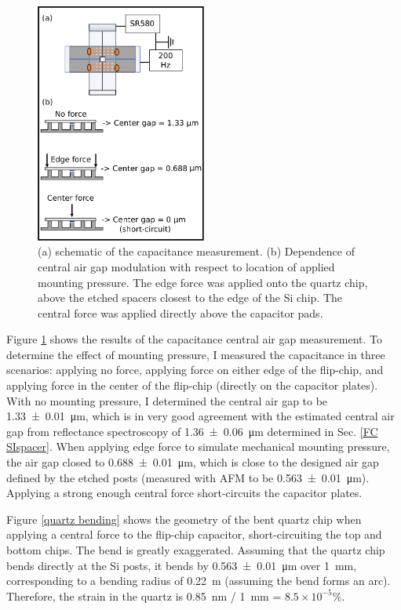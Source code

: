 \documentclass[double,12pt,1in,seploa]{beavtex}
\begin{document}
\begin{figure}
    \includegraphics[width = 0.5\textwidth]{FC capacitance measurement.pdf}
    \caption{(a) schematic of the capacitance measurement. (b) Dependence of central air gap modulation with respect to location of applied mounting pressure. The edge force was applied onto the quartz chip, above the etched spacers closest to the edge of the Si chip. The central force was applied directly above the capacitor pads.}
    \label{FC cap measurement}
\end{figure}



Figure \ref{FC cap measurement} shows the results of the capacitance central air gap measurement. To determine the effect of mounting pressure, I measured the capacitance in three scenarios: applying no force, applying force on either edge of the flip-chip, and applying force in the center of the flip-chip (directly on the capacitor plates). With no mounting pressure, I determined the central air gap to be \SI{1.33(1)}{\micro\meter}, which is in very good agreement with the estimated central air gap from reflectance spectroscopy of \SI{1.36(6)}{\micro\meter} determined in Sec. \ref{FC SIspacer}. When applying edge force to simulate mechanical mounting pressure, the air gap closed to  \SI{0.688(10)}{\micro\meter}, which is close to the designed air gap defined by the etched posts (measured with AFM to be \SI{0.563(10)}{\micro\meter}). Applying a strong enough central force short-circuits the capacitor plates. 

Figure \ref{quartz bending} shows the geometry of the bent quartz chip when applying a central force to the flip-chip capacitor, short-circuiting the top and bottom chips. The bend is greatly exaggerated. Assuming that the quartz chip bends directly at the Si posts, it bends by \SI{0.563(10)}{\micro\meter} over \SI{1}{\milli\meter}, corresponding to a bending radius of \SI{0.22}{\meter} (assuming the bend forms an arc). Therefore, the strain in the quartz is \SI{0.85}{\nano\meter} / \SI{1}{\milli\meter} = $8.5 \times 10^{-5} \% $.
\end{document}
